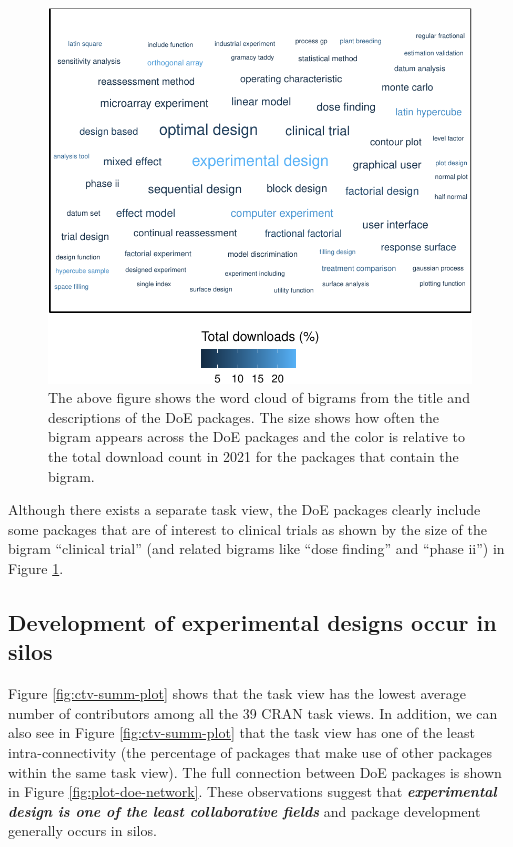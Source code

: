 \begin{figure}[htbp]

{\centering \includegraphics{figures/wordcloud-over-time-1} 

}

\caption{The above figure shows the word cloud of bigrams from the title and descriptions of the DoE packages. The size shows how often the bigram appears across the DoE packages and the color is relative to the total download count in 2021 for the packages that contain the bigram.}\label{fig:wordcloud-over-time}
\end{figure}

Although there exists a separate  task view, the DoE packages clearly include some packages that are of interest to clinical trials as shown by the size of the bigram ``clinical trial'' (and related bigrams like ``dose finding'' and ``phase ii'') in Figure \ref{fig:wordcloud-over-time}.

\hypertarget{development-of-experimental-designs-occur-in-silos}{%
\subsection{Development of experimental designs occur in silos}\label{development-of-experimental-designs-occur-in-silos}}

Figure \ref{fig:ctv-summ-plot} shows that the  task view has the lowest average number of contributors among all the 39 CRAN task views. In addition, we can also see in Figure \ref{fig:ctv-summ-plot} that the  task view has one of the least intra-connectivity (the percentage of packages that make use of other packages within the same task view). The full connection between DoE packages is shown in Figure \ref{fig:plot-doe-network}. These observations suggest that \textbf{\emph{experimental design is one of the least collaborative fields}} and package development generally occurs in silos.

